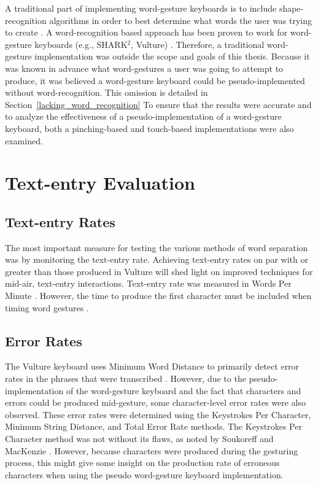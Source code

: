 A traditional part of implementing word-gesture keyboards is to include shape-recognition algorithms in order to best determine what words the user was trying to create \cite{ref_shape_writing,ref_the_word_gesture_keyboard,ref_shapewriter_iphone,ref_shark_wgk,ref_shorthand_writing}. A word-recognition based approach has been proven to work for word-gesture keyboards (e.g., SHARK$^2$, Vulture) \cite{ref_shape_writing,ref_shark_wgk,ref_vulture}. Therefore, a traditional word-gesture implementation was outside the scope and goals of this thesis. Because it was known in advance what word-gestures a user was going to attempt to produce, it was believed a word-gesture keyboard could be pseudo-implemented without word-recognition. This omission is detailed in Section~\ref{lacking_word_recognition} To ensure that the results were accurate and to analyze the effectiveness of a pseudo-implementation of a word-gesture keyboard, both a pinching-based and touch-based implementations were also examined.

\section{Text-entry Evaluation} \label{text_eval}
\subsection{Text-entry Rates}
The most important measure for testing the various methods of word separation was by monitoring the text-entry rate. Achieving text-entry rates on par with or greater than those produced in Vulture will shed light on improved techniques for mid-air, text-entry interactions. Text-entry rate was measured in Words Per Minute \cite{ref_wpm_word_gesture_formula}. However, the time to produce the first character must be included when timing word gestures \cite{ref_wpm_word_gesture_timing}.

\subsection{Error Rates}
The Vulture keyboard uses Minimum Word Distance to primarily detect error rates in the phrases that were transcribed \cite{ref_vulture}. However, due to the pseudo-implementation of the word-gesture keyboard and the fact that characters and errors could be produced mid-gesture, some character-level error rates were also observed. These error rates were determined using the Keystrokes Per Character, Minimum String Distance, and Total Error Rate \cite{ref_error_rates} methods. The Keystrokes Per Character method was not without its flaws, as noted by Soukoreff and MacKenzie \citeyear{ref_error_rates}. However, because characters were produced during the gesturing process, this might give some insight on the production rate of erroneous characters when using the pseudo word-gesture keyboard implementation.

